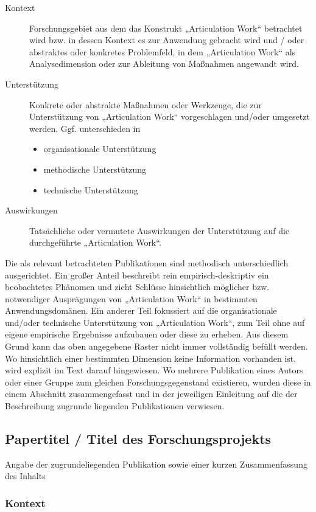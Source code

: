 \begin{description}
	\item[Kontext] Forschungsgebiet aus dem das Konstrukt „Articulation Work“ betrachtet wird bzw. in dessen Kontext es zur Anwendung gebracht wird und / oder abstraktes oder konkretes Problemfeld, in dem „Articulation Work“ als Analysedimension oder zur Ableitung von Maßnahmen angewandt wird.
	\item[Unterstützung] Konkrete oder abstrakte Maßnahmen oder Werkzeuge, die zur Unterstützung von „Articulation Work“ vorgeschlagen und/oder umgesetzt werden. Ggf. unterschieden in
	\begin{itemize}
		\item organisationale Unterstützung
		\item methodische Unterstützung
		\item technische Unterstützung
	\end{itemize}
	\item[Auswirkungen] Tatsächliche oder vermutete Auswirkungen der Unterstützung auf die durchgeführte „Articulation Work“.
\end{description}

Die als relevant betrachteten Publikationen sind methodisch unterschiedlich ausgerichtet. Ein großer Anteil beschreibt rein empirisch-deskriptiv ein beobachtetes Phänomen und zieht Schlüsse hinsichtlich möglicher bzw. notwendiger Ausprägungen von „Articulation Work“ in bestimmten Anwendungsdomänen. Ein anderer Teil fokussiert auf die organisationale und/oder technische Unterstützung von „Articulation Work“, zum Teil ohne auf eigene empirische Ergebnisse aufzubauen oder diese zu erheben. Aus diesem Grund kann das oben angegebene Raster nicht immer vollständig befüllt werden. Wo hinsichtlich einer bestimmten Dimension keine Information vorhanden ist, wird explizit im Text darauf hingewiesen. Wo mehrere Publikation eines Autors oder einer Gruppe zum gleichen Forschungsgegenstand existieren, wurden diese in einem Abschnitt zusammengefasst und in der jeweiligen Einleitung auf die der Beschreibung zugrunde liegenden Publikationen verwiesen.

\subsection{Papertitel / Titel des Forschungsprojekts}

Angabe der zugrundeliegenden Publikation sowie einer kurzen Zusammenfassung des Inhalts

\subsubsection{Kontext}

